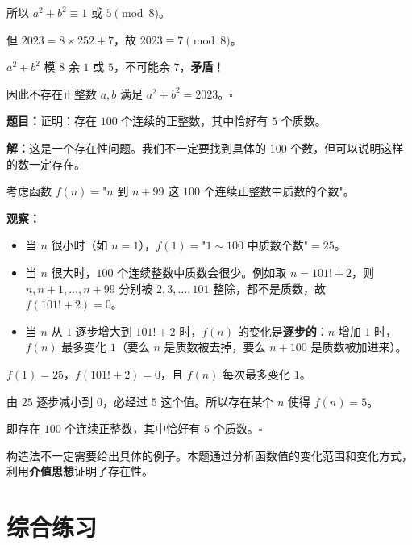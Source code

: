\documentclass[12pt, a4paper]{ctexart}
\begin{document}
所以 $a^2+b^2\equiv 1$ 或 $5\pmod{8}$。

但 $2023=8\times 252+7$，故 $2023\equiv 7\pmod{8}$。

$a^2+b^2$ 模 $8$ 余 $1$ 或 $5$，不可能余 $7$，\textbf{矛盾}！

因此不存在正整数 $a,b$ 满足 $a^2+b^2=2023$。\hfill$\square$

\begin{examplebox}[【例19】构造法证明存在性]
\textbf{题目：}证明：存在 $100$ 个连续的正整数，其中恰好有 $5$ 个质数。
\end{examplebox}

\textbf{解：}\;这是一个存在性问题。我们不一定要找到具体的 $100$ 个数，但可以说明这样的数一定存在。

考虑函数 $f(n)=$"$n$ 到 $n+99$ 这 $100$ 个连续正整数中质数的个数"。

\textbf{观察：}
\begin{itemize}[itemsep=1pt]
  \item 当 $n$ 很小时（如 $n=1$），$f(1)=$"$1\sim 100$ 中质数个数"$=25$。
  \item 当 $n$ 很大时，$100$ 个连续整数中质数会很少。例如取 $n=101!+2$，则 $n,n+1,\ldots,n+99$ 分别被 $2,3,\ldots,101$ 整除，都不是质数，故 $f(101!+2)=0$。
  \item 当 $n$ 从 $1$ 逐步增大到 $101!+2$ 时，$f(n)$ 的变化是\textbf{逐步的}：$n$ 增加 $1$ 时，$f(n)$ 最多变化 $1$（要么 $n$ 是质数被去掉，要么 $n+100$ 是质数被加进来）。
\end{itemize}

$f(1)=25$，$f(101!+2)=0$，且 $f(n)$ 每次最多变化 $1$。

由 $25$ 逐步减小到 $0$，必经过 $5$ 这个值。所以存在某个 $n$ 使得 $f(n)=5$。

即存在 $100$ 个连续正整数，其中恰好有 $5$ 个质数。\hfill$\square$

\begin{tipbox}[方法总结]
构造法不一定需要给出具体的例子。本题通过分析函数值的变化范围和变化方式，利用\textbf{介值思想}证明了存在性。
\end{tipbox}

\newpage
\section*{\textcolor{tipgreen}{综合练习}}
\end{document}
